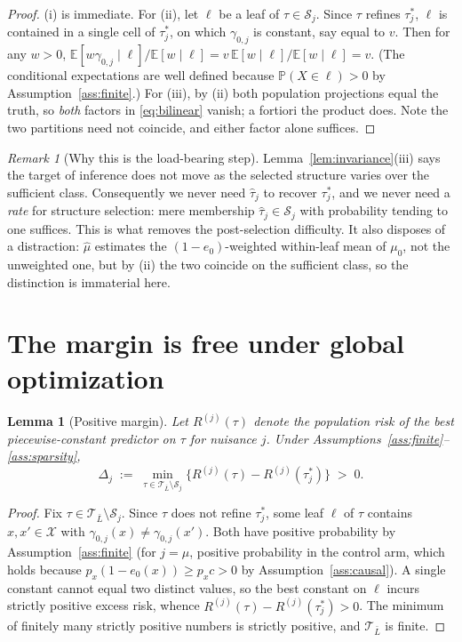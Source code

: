 \documentclass[11pt]{article}
\theoremstyle{plain}
\newtheorem{lemma}{Lemma}
\theoremstyle{definition}
\theoremstyle{remark}
\newtheorem{remark}{Remark}
\newcommand{\E}{\mathbb{E}}
\newcommand{\PP}{\mathbb{P}}
\newcommand{\cX}{\mathcal{X}}
\newcommand{\cT}{\mathcal{T}}
\newcommand{\cS}{\mathcal{S}}
\newcommand{\ez}{e_0}
\newcommand{\mz}{\mu_0}
\newcommand{\mhat}{\widehat{\mu}}
\newcommand{\that}{\widehat{\tau}}
\begin{document}
\begin{proof}
(i) is immediate. For (ii), let $\ell$ be a leaf of $\tau\in\cS_j$. Since $\tau$
refines $\tau^*_j$, $\ell$ is contained in a single cell of $\tau^*_j$, on which
$\gamma_{0,j}$ is constant, say equal to $v$. Then for any $w>0$,
$\E[w\gamma_{0,j}\mid \ell]/\E[w\mid\ell] = v\,\E[w\mid\ell]/\E[w\mid\ell]=v$.
(The conditional expectations are well defined because $\PP(X\in\ell)>0$ by
Assumption~\ref{ass:finite}.) For (iii), by (ii) both population projections
equal the truth, so \emph{both} factors in \eqref{eq:bilinear} vanish; a fortiori
the product does. Note the two partitions need not coincide, and either factor
alone suffices.
\end{proof}

\begin{remark}[Why this is the load-bearing step]\label{rem:load-bearing}
Lemma~\ref{lem:invariance}(iii) says the target of inference does not move as the
selected structure varies over the sufficient class. Consequently we never need
$\that_j$ to recover $\tau^*_j$, and we never need a \emph{rate} for structure
selection: mere membership $\that_j\in\cS_j$ with probability tending to one
suffices. This is what removes the post-selection difficulty. It also disposes of
a distraction: $\mhat$ estimates the $(1-\ez)$-weighted within-leaf mean of
$\mz$, not the unweighted one, but by (ii) the two coincide on the sufficient
class, so the distinction is immaterial here.
\end{remark}

\section{The margin is free under global optimization}

\begin{lemma}[Positive margin]\label{lem:margin}
Let $R^{(j)}(\tau)$ denote the population risk of the best piecewise-constant
predictor on $\tau$ for nuisance $j$. Under
Assumptions~\ref{ass:finite}--\ref{ass:sparsity},
\[
  \Delta_j \;:=\; \min_{\tau\in\cT_{\bar L}\setminus\cS_j}
      \bigl\{R^{(j)}(\tau)-R^{(j)}(\tau^*_j)\bigr\} \;>\; 0 .
\]
\end{lemma}

\begin{proof}
Fix $\tau\in\cT_{\bar L}\setminus\cS_j$. Since $\tau$ does not refine $\tau^*_j$,
some leaf $\ell$ of $\tau$ contains $x,x'\in\cX$ with
$\gamma_{0,j}(x)\neq\gamma_{0,j}(x')$. Both have positive probability by
Assumption~\ref{ass:finite} (for $j=\mu$, positive probability in the control
arm, which holds because $p_x(1-\ez(x))\ge p_x c>0$ by
Assumption~\ref{ass:causal}). A single constant cannot equal two distinct values,
so the best constant on $\ell$ incurs strictly positive excess risk, whence
$R^{(j)}(\tau)-R^{(j)}(\tau^*_j)>0$. The minimum of finitely many strictly
positive numbers is strictly positive, and $\cT_{\bar L}$ is finite.
\end{proof}
\end{document}
